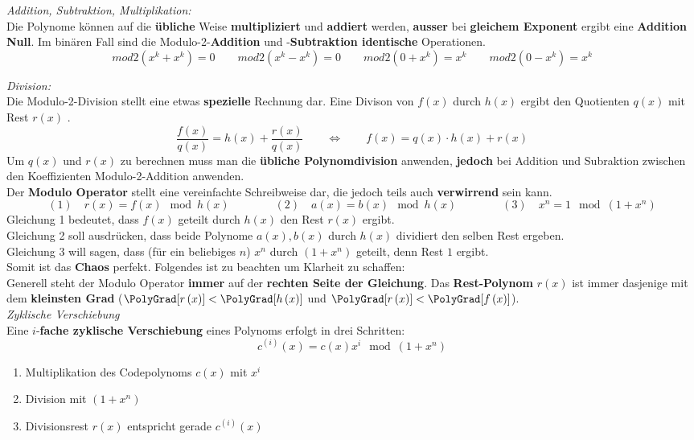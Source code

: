 \textit{Addition, Subtraktion, Multiplikation:} \\
Die Polynome können auf die \textbf{übliche} Weise \textbf{multipliziert} und \textbf{addiert} werden,
\textbf{ausser} bei \textbf{gleichem Exponent} ergibt eine \textbf{Addition Null}.
Im binären Fall sind die Modulo-2-\textbf{Addition} und
-\textbf{Subtraktion identische} Operationen. 
$$ mod2(x^k + x^k) = 0 \qquad mod2(x^k - x^k) = 0 \qquad mod2(0 + x^k) = x^k \qquad mod2(0 - x^k) = x^k$$

\textit{Division:}\\
Die Modulo-2-Division stellt eine etwas \textbf{spezielle} Rechnung dar.
Eine Divison von \boldmath$f(x)$ durch $h(x)$ ergibt den Quotienten $q(x)$ mit Rest $r(x)$
\unboldmath . 
$$ \dfrac{f(x)}{q(x)} = h(x) + \dfrac{r(x)}{q(x)} \qquad \Longleftrightarrow \qquad f(x) = q(x)
\cdot h(x) + r(x)$$ 
Um $q(x)$ und $r(x)$ zu berechnen muss man die \textbf{übliche Polynomdivision} anwenden, \textbf{jedoch}
bei Addition und Subraktion zwischen den Koeffizienten Modulo-2-Addition anwenden. \\ 
Der \textbf{Modulo Operator} stellt eine vereinfachte Schreibweise dar, die jedoch teils auch
\textbf{verwirrend} sein kann.
$$ (1) \quad r(x) = f(x) \mod{h(x)} \qquad \qquad 
(2) \quad a(x) = b(x) \mod{h(x)} \qquad \qquad 
(3) \quad x^n = 1 \mod{(1 + x^n)}$$
Gleichung 1 bedeutet, dass $f(x)$ geteilt durch $h(x)$ den Rest $r(x)$ ergibt. \\
Gleichung 2 soll ausdrücken, dass beide Polynome $a(x), b(x)$ durch $h(x)$ dividiert den selben
Rest ergeben. \\
Gleichung 3 will sagen, dass (für ein beliebiges $n$) $x^n$ durch $(1 + x^n)$ geteilt, denn Rest
$1$ ergibt. \\
Somit ist das \textbf{Chaos} perfekt. Folgendes ist zu beachten um Klarheit zu schaffen:\\
Generell steht der Modulo Operator \textbf{immer} auf der \textbf{rechten Seite der Gleichung}. 
Das \textbf{Rest-Polynom} $r(x)$ ist immer dasjenige mit dem \textbf{kleinsten Grad
}($\PolyGrad[r \left( x \right)] < \PolyGrad[h \left(x \right)]$ und
$\PolyGrad[r \left(x \right) ] < \PolyGrad[f \left( x \right)]$).
\\

\textit{Zyklische Verschiebung} \\
Eine $i$-\textbf{fache zyklische Verschiebung} eines Polynoms erfolgt in drei Schritten:
$$ c^{(i)}(x) = c(x) x^i \mod{(1+x^n)}$$
\begin{enumerate}
  \item Multiplikation des Codepolynoms $c(x)$ mit $x^i$
  \item Division mit $(1+x^n)$
  \item Divisionsrest $r(x)$ entspricht gerade $c^{(i)}(x)$
\end{enumerate}

